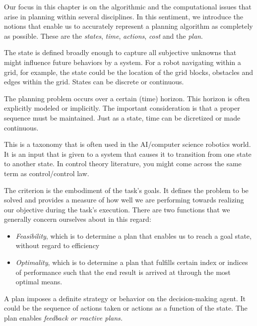 Our focus in this chapter is on the algorithmic and the computational issues that arise in planning within several disciplines. In this sentiment, we introduce the notions that enable us to accurately represent a planning algorithm as completely as possible. These are the \textit{states}, \textit{time}, \textit{actions},  \textit{cost} and the \textit{plan}.
%
\begin{definition}[State]
	The state is defined broadly enough to capture all subjective unknowns that might influence future behaviors by a system. For a robot navigating within a grid, for example, the state could be the location of the grid blocks, obstacles and edges within the grid. States can be discrete or continuous. 
\end{definition}
%
\begin{definition}[Time]
The planning problem occurs over a certain (time) horizon. This horizon is often explicitly modeled or implicitly. The important consideration is that a proper sequence must be maintained. Just as a state, time can be dicretized or made continuous.
\end{definition}
%
\begin{definition}[Actions]
	This is a taxonomy that is often used in the AI/computer science robotics world. It is an input that is given to a system that causes it to transition from one state to another state. In control theory literature, you might come across the same term as control/control law.
\end{definition}
%
\begin{definition}[Criterion]
	The criterion is the embodiment of the task's goals. It defines the problem to be solved and provides a measure of how well we are performing towards realizing our objective during the task's execution. There are two functions that we generally concern ourselves about in this regard: 
	\begin{itemize}
	\item \textit{Feasibility}, which is to determine a plan that enables us to reach a goal state, without regard to efficiency
	\item \textit{Optimality}, which is to determine a plan that fulfills certain index or indices of performance such that the end result is arrived at through the most optimal means.
	\end{itemize}
\end{definition}
%
\begin{definition}[Plan]
	A plan imposes a definite strategy or behavior on the decision-making agent. It could be the sequence of actions taken or actions as a function of the state. The plan enables \textit{feedback or reactive plans.}
\end{definition}
%

